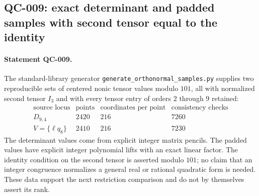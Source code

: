 \subsection{QC-009: exact determinant and padded samples with second tensor equal to the identity}

\paragraph{Statement QC-009.}
The standard-library generator
\texttt{generate\_orthonormal\_samples.py} supplies two reproducible
sets of centered nonic tensor values modulo $101$, all with normalized
second tensor $I_3$ and with every tensor entry of orders $2$ through
$9$ retained:
\[
\begin{array}{c|r|r|r}
\text{source locus}&\text{points}&\text{coordinates per point}&
 \text{consistency checks}\\\hline
D_{9,4}&2420&216&7260\\
V=\{\ell q_8\}&2410&216&7230
\end{array}
\tag{QC-009.1}
\]
The determinant values come from explicit integer matrix pencils.
The padded values have explicit integer polynomial lifts with an
exact linear factor. The identity condition on the second tensor
is asserted modulo $101$; no claim that an integer congruence
normalizes a general real or rational quadratic form is needed.
These data support the next restriction comparison and do not
by themselves assert its rank.

